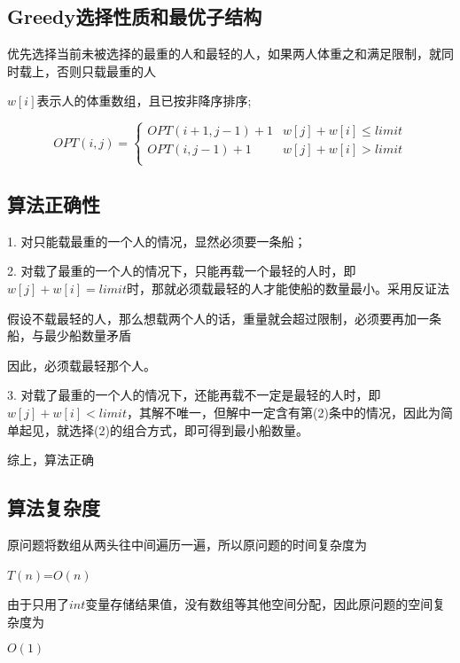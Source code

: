 \documentclass{article}
\begin{document}
\subsection{Greedy选择性质和最优子结构}
优先选择当前未被选择的最重的人和最轻的人，如果两人体重之和满足限制，就同时载上，否则只载最重的人
\par $w[i]$表示人的体重数组，且已按非降序排序;
\begin{center}
    $$OPT(i,j)=
\begin{cases}
    OPT(i+1, j-1)+1& \text{$w[j]+w[i] \leq limit$}\\
    OPT(i, j-1)+1& \text{$w[j]+w[i] > limit$}\\
\end{cases}$$
\end{center}

\subsection{算法正确性}
1. 对只能载最重的一个人的情况，显然必须要一条船；
\par 2. 对载了最重的一个人的情况下，只能再载一个最轻的人时，即$w[j]+w[i] = limit$时，那就必须载最轻的人才能使船的数量最小。采用反证法
\par 假设不载最轻的人，那么想载两个人的话，重量就会超过限制，必须要再加一条船，与最少船数量矛盾
\par 因此，必须载最轻那个人。
\par 3. 对载了最重的一个人的情况下，还能再载不一定是最轻的人时，即$w[j]+w[i]<limit$，其解不唯一，但解中一定含有第(2)条中的情况，因此为简单起见，就选择(2)的组合方式，即可得到最小船数量。
\par 综上，算法正确


\subsection{算法复杂度}
原问题将数组从两头往中间遍历一遍，所以原问题的时间复杂度为
\begin{center}
    $T(n)$=$O(n)$ 
\end{center} 
\par 由于只用了$int$变量存储结果值，没有数组等其他空间分配，因此原问题的空间复杂度为
\begin{center}
    $O(1)$
\end{center} 
\end{document}
